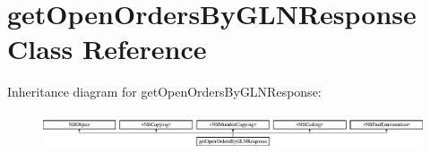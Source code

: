 \hypertarget{interfaceget_open_orders_by_g_l_n_response}{}\section{get\+Open\+Orders\+By\+G\+L\+N\+Response Class Reference}
\label{interfaceget_open_orders_by_g_l_n_response}
Inheritance diagram for get\+Open\+Orders\+By\+G\+L\+N\+Response\+:\begin{figure}[H]
\begin{center}
\leavevmode
\includegraphics[height=1.103448cm]{interfaceget_open_orders_by_g_l_n_response}
\end{center}
\end{figure}
